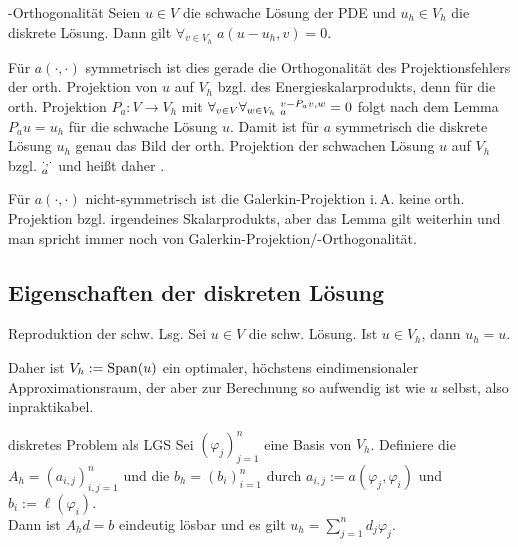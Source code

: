 \linie

\begin{Lemma}{-Orthogonalität}
    Seien $u \in V$ die schwache Lösung der PDE und
    $u_h \in V_h$ die diskrete Lösung.
    Dann gilt $\forall_{v \in V_h}\; a(u - u_h, v) = 0$.
\end{Lemma}

\begin{Bem}
    Für $a(\cdot, \cdot)$ symmetrisch ist dies gerade die Orthogonalität des
    Projektionsfehlers der orth. Projektion von $u$ auf $V_h$ bzgl. des Energieskalarprodukts,
    denn für die orth. Projektion $P_a\colon V \to V_h$ mit
    $\forall_{v \in V} \forall_{w \in V_h}\; \sp{v - P_a v, w}_a = 0$
    folgt nach dem Lemma $P_a u = u_h$ für die schwache Lösung $u$.
    Damit ist für $a$ symmetrisch die diskrete Lösung $u_h$ genau das Bild der
    orth. Projektion der schwachen Lösung $u$ auf $V_h$ bzgl. $\sp{\cdot, \cdot}_a$
    und heißt daher .

    Für $a(\cdot, \cdot)$ nicht-symmetrisch ist die Galerkin-Projektion i.\,A.
    keine orth. Projektion bzgl. irgendeines Skalarprodukts,
    aber das Lemma gilt weiterhin und man spricht immer noch von
    Galerkin-Projektion/-Orthogonalität.
\end{Bem}

\subsection{%
    Eigenschaften der diskreten Lösung%
}

\begin{Lemma}{Reproduktion der schw. Lsg.}
    Sei $u \in V$ die schw. Lösung.
    Ist $u \in V_h$, dann $u_h = u$.
\end{Lemma}

\begin{Bem}
    Daher ist $V_h := \operatorname{Span}(u)$ ein optimaler, höchstens eindimensionaler Approximationsraum,
    der aber zur Berechnung so aufwendig ist wie $u$ selbst, also inpraktikabel.
\end{Bem}

\linie

\begin{Satz}{diskretes Problem als LGS}
    Sei $(\varphi_j)_{j=1}^n$ eine Basis von $V_h$.
    Definiere die  $A_h = (a_{i,j})_{i,j=1}^n$
    und die  $b_h = (b_i)_{i=1}^n$ durch
    $a_{i,j} := a(\varphi_j, \varphi_i)$ und $b_i := \ell(\varphi_i)$.\\
    Dann ist $A_h d = b$ eindeutig lösbar und es gilt $u_h = \sum_{j=1}^n d_j \varphi_j$.
\end{Satz}

